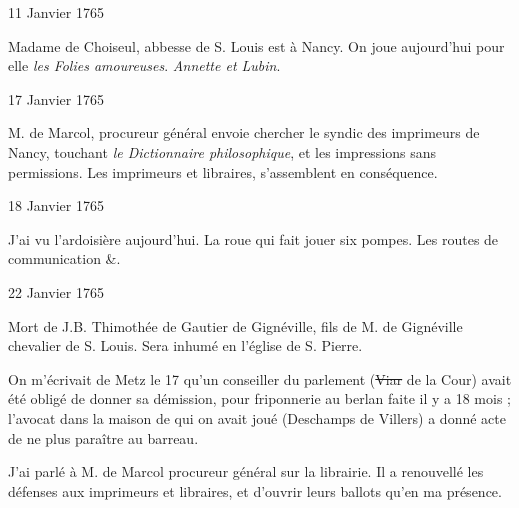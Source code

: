                      \begin{diary}{11 Janvier 1765}{}


                           Madame de Choiseul, abbesse de S. Louis est à
                           Nancy. On joue aujourd'hui
                           pour elle \emph{les
                              Folies amoureuses}. \emph{Annette et
                              Lubin}. \bigskip


                     \end{diary}

                     \begin{diary}{17 Janvier 1765}{}


                           M. de Marcol, procureur général
                           envoie chercher le syndic
                           des imprimeurs de Nancy,
                           touchant \emph{le Dictionnaire
                              philosophique}, et les impressions sans permissions.
                           Les imprimeurs et libraires, s'assemblent en conséquence. \bigskip


                     \end{diary}

                     \begin{diary}{18 Janvier 1765}{}


                           J'ai vu l'ardoisière
                           aujourd'hui. La roue qui
                           fait jouer six pompes. Les routes de communication \&. \bigskip


                     \end{diary}

                     \begin{diary}{22 Janvier 1765}{}

                         Mort de J.B. Thimothée de Gautier de
                              Gignéville,
                           fils de M. de
                              Gignéville
                           chevalier de S. Louis. Sera
                           inhumé en l’église de S.
                              Pierre. \bigskip


                         On m'écrivait de Metz
                           le 17 qu'un conseiller
                           du parlement (\sout{Viar} de la Cour) avait été obligé de donner sa démission, pour friponnerie
                           au berlan faite il y a 18
                           mois ; l'avocat dans
                           la maison de qui on avait joué (Deschamps
                              de Villers) a donné acte de ne plus paraître
                           au barreau. \bigskip


                         J'ai parlé à M. de Marcol
                           procureur général sur la
                           librairie. Il a renouvellé les défenses aux
                           imprimeurs et libraires, et d'ouvrir leurs
                           ballots qu'en ma
                           présence. \bigskip


                     \end{diary}


